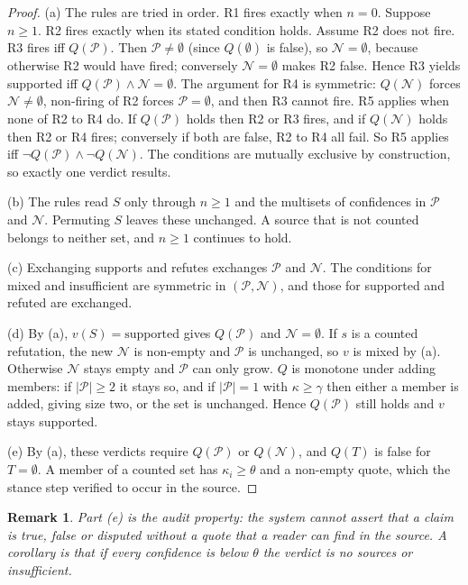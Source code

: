 \documentclass[11pt,a4paper]{article}
\newtheorem{remark}{Remark}
\begin{document}
\begin{proof}
(a) The rules are tried in order. R1 fires exactly when $n=0$. Suppose $n \ge 1$. R2 fires exactly when its stated condition holds. Assume R2 does not fire. R3 fires iff $Q(\mathcal{P})$. Then $\mathcal{P}\ne\emptyset$ (since $Q(\emptyset)$ is false), so $\mathcal{N}=\emptyset$, because otherwise R2 would have fired; conversely $\mathcal{N}=\emptyset$ makes R2 false. Hence R3 yields supported iff $Q(\mathcal{P}) \land \mathcal{N}=\emptyset$. The argument for R4 is symmetric: $Q(\mathcal{N})$ forces $\mathcal{N}\ne\emptyset$, non-firing of R2 forces $\mathcal{P}=\emptyset$, and then R3 cannot fire. R5 applies when none of R2 to R4 do. If $Q(\mathcal{P})$ holds then R2 or R3 fires, and if $Q(\mathcal{N})$ holds then R2 or R4 fires; conversely if both are false, R2 to R4 all fail. So R5 applies iff $\neg Q(\mathcal{P}) \land \neg Q(\mathcal{N})$. The conditions are mutually exclusive by construction, so exactly one verdict results.

(b) The rules read $S$ only through $n \ge 1$ and the multisets of confidences in $\mathcal{P}$ and $\mathcal{N}$. Permuting $S$ leaves these unchanged. A source that is not counted belongs to neither set, and $n \ge 1$ continues to hold.

(c) Exchanging supports and refutes exchanges $\mathcal{P}$ and $\mathcal{N}$. The conditions for mixed and insufficient are symmetric in $(\mathcal{P},\mathcal{N})$, and those for supported and refuted are exchanged.

(d) By (a), $v(S)=\text{supported}$ gives $Q(\mathcal{P})$ and $\mathcal{N}=\emptyset$. If $s$ is a counted refutation, the new $\mathcal{N}$ is non-empty and $\mathcal{P}$ is unchanged, so $v$ is mixed by (a). Otherwise $\mathcal{N}$ stays empty and $\mathcal{P}$ can only grow. $Q$ is monotone under adding members: if $|\mathcal{P}| \ge 2$ it stays so, and if $|\mathcal{P}|=1$ with $\kappa \ge \gamma$ then either a member is added, giving size two, or the set is unchanged. Hence $Q(\mathcal{P})$ still holds and $v$ stays supported.

(e) By (a), these verdicts require $Q(\mathcal{P})$ or $Q(\mathcal{N})$, and $Q(T)$ is false for $T = \emptyset$. A member of a counted set has $\kappa_i \ge \theta$ and a non-empty quote, which the stance step verified to occur in the source.
\end{proof}

\begin{remark}
Part (e) is the audit property: the system cannot assert that a claim is true, false or disputed without a quote that a reader can find in the source. A corollary is that if every confidence is below $\theta$ the verdict is no sources or insufficient.
\end{remark}
\end{document}
